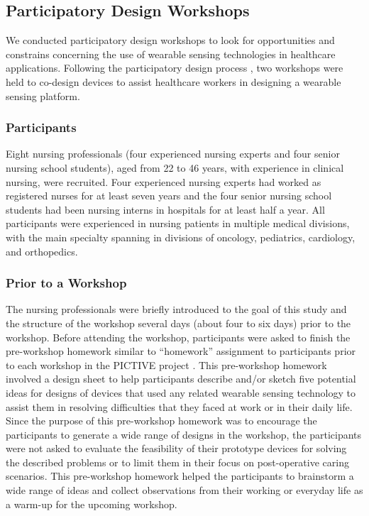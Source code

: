 \subsection{Participatory Design Workshops}
We conducted participatory design workshops to look for opportunities and constrains concerning the use of wearable sensing technologies in healthcare applications. Following the participatory design process \cite{Greenbaum:1992:DWC:125470, Muller:2002:PDT:772072.772138}, two workshops were held to co-design devices to assist healthcare workers in designing a wearable sensing platform.

\subsubsection{Participants}
Eight nursing professionals (four experienced nursing experts and four senior nursing school students), aged from 22 to 46 years, with experience in clinical nursing, were recruited. Four experienced nursing experts had worked as registered nurses for at least seven years and the four senior nursing school students had been nursing interns in hospitals for at least half a year. All participants were experienced in nursing patients in multiple medical divisions, with the main specialty spanning in divisions of oncology, pediatrics, cardiology, and orthopedics.

\subsubsection{Prior to a Workshop}
The nursing professionals were briefly introduced to the goal of this study and the structure of the workshop several days (about four to six days) prior to the workshop. Before attending the workshop, participants were asked to finish the pre-workshop homework similar to “homework” assignment to participants prior to each workshop in the PICTIVE project \cite{Muller:1991:PEP:108844.108896}. This pre-workshop homework involved a design sheet to help participants describe and/or sketch five potential ideas for designs of devices that used any related wearable sensing technology to assist them in resolving difficulties that they faced at work or in their daily life. Since the purpose of this pre-workshop homework was to encourage the participants to generate a wide range of designs in the workshop, the participants were not asked to evaluate the feasibility of their prototype devices for solving the described problems or to limit them in their focus on post-operative caring scenarios. This pre-workshop homework helped the participants to brainstorm a wide range of ideas and collect observations from their working or everyday life as a warm-up for the upcoming workshop.

